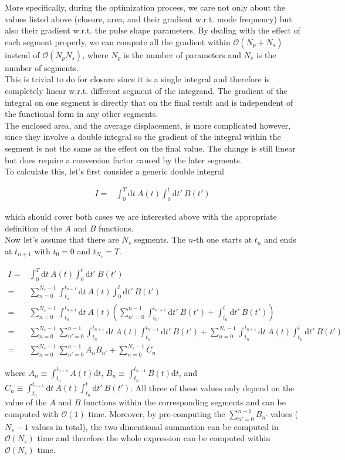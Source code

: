 \documentclass[10pt,fleqn]{article}
\newcommand{\ud}{\mathrm{d}}
\newcommand{\dsum}{\displaystyle\sum}
\newcommand{\dint}{\displaystyle\int}
\newcommand{\eqar}[1]
{
  \begin{align*}
    #1
  \end{align*}
}
\newcommand{\paren}[1]{{\left({#1}\right)}}
\begin{document}
More specifically, during the optimization process,
we care not only about the values listed above (closure, area,
and their gradient w.r.t. mode frequency)
but also their gradient w.r.t. the pulse shape parameters.
By dealing with the effect of each segment properly,
we can compute all the gradient within $\mathcal{O}(N_p + N_s)$
instead of $\mathcal{O}(N_pN_s)$, where $N_p$ is the number of parameters
and $N_s$ is the number of segments.\\

This is trivial to do for closure since it is a single integral
and therefore is completely linear w.r.t. different segment of the integrand.
The gradient of the integral on one segment is directly that on the final result
and is independent of the functional form in any other segments.\\

The enclosed area, and the average displacement, is more complicated however,
since they involve a double integral so the gradient of the integral
within the segment is not the same as the effect on the final value.
The change is still linear but does require a conversion factor
caused by the later segments.\\

To calculate this, let's first consider a generic double integral
\eqar{
  I=&\int_0^T\!\!\ud t\ A(t)\int_0^t\!\!\ud t'\ B(t')
}
which should cover both cases we are interested above
with the appropriate definition of the $A$ and $B$ functions.\\

Now let's assume that there are $N_s$ segments. The $n$-th one starts
at $t_{n}$ and ends at $t_{n+1}$ with $t_0=0$ and $t_{N_s}=T$.
\eqar{
  I=&\int_0^T\!\!\ud t\ A(t)\int_0^t\!\!\ud t'\ B(t')\\
  =&\sum_{n=0}^{N_s-1}\int_{t_{n}}^{t_{n+1}}\!\!\ud t\ A(t)\int_0^t\!\!\ud t'\ B(t')\\
  =&\sum_{n=0}^{N_s-1}\int_{t_{n}}^{t_{n+1}}\!\!\ud t\ A(t)
  \paren{\sum_{n'=0}^{n-1}\int_{t_{n'}}^{t_{n'+1}}\!\!\ud t'\ B(t')+\int_{t_n}^{t}\!\!\ud t'\ B(t')}\\
  =&\sum_{n=0}^{N_s-1}\sum_{n'=0}^{n-1}\int_{t_{n}}^{t_{n+1}}\!\!\ud t\ A(t)
  \int_{t_{n'}}^{t_{n'+1}}\!\!\ud t'\ B(t')+\sum_{n=0}^{N_s-1}\int_{t_{n}}^{t_{n+1}}\!\!\ud t\ A(t)\int_{t_n}^{t}\!\!\ud t'\ B(t')\\
  =&\sum_{n=0}^{N_s-1}\sum_{n'=0}^{n-1}A_{n}B_{n'}+\sum_{n=0}^{N_s-1}C_n
}
where $A_n\equiv\dint_{t_n}^{t_{n+1}}A(t)\ud t$, $B_n\equiv\dint_{t_n}^{t_{n+1}}B(t)\ud t$,
and $C_n\equiv\dint_{t_{n}}^{t_{n+1}}\!\!\ud t\ A(t)\dint_{t_n}^{t}\!\!\ud t'\ B(t')$.
All three of these values only depend on the value of the $A$ and $B$ functions
within the corresponding segments and can be computed with $\mathcal{O}(1)$ time.
Moreover, by pre-computing the $\dsum_{n'=0}^{n-1}B_{n'}$ values ($N_s-1$ values in total),
the two dimentional summation can be computed in $\mathcal{O}(N_s)$ time
and therefore the whole expression can be computed within $\mathcal{O}(N_s)$ time.\\
\end{document}
